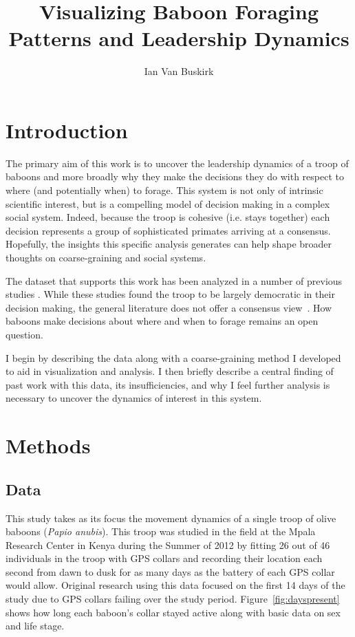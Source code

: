 \documentclass[11pt]{article}
\begin{document}
\title{Visualizing Baboon Foraging Patterns and Leadership Dynamics}
\author{Ian Van Buskirk}
\date{}
\maketitle

\section{Introduction}

The primary aim of this work is to uncover the leadership dynamics of a troop of baboons and more broadly why they make the decisions they do with respect to where (and potentially when) to forage. This system is not only of intrinsic scientific interest, but is a compelling model of decision making in a complex social system. Indeed, because the troop is cohesive (i.e. stays together) each decision represents a group of sophisticated primates arriving at a consensus. Hopefully, the insights this specific analysis generates can help shape broader thoughts on coarse-graining and social systems.

The dataset that supports this work has been analyzed in a number of previous studies \cite{strandburg2015shared,strandburg2017habitat,farine2017individual}. While these studies found the troop to be largely democratic in their decision making, the general literature does not offer a consensus view~\cite{tokuyama2017leadership,lee2016partially,king2011rule,stueckle2008follow,sapolsky2007primate}. How baboons make decisions about where and when to forage remains an open question.

I begin by describing the data along with a coarse-graining method I developed to aid in visualization and analysis. I then briefly describe a central finding of past work with this data, its insufficiencies, and why I feel further analysis is necessary to uncover the dynamics of interest in this system.

\section{Methods}

\subsection{Data}

This study takes as its focus the movement dynamics of a single troop of olive baboons (\textit{Papio anubis}). This troop was studied in the field at the Mpala Research Center in Kenya during the Summer of 2012 by fitting 26 out of 46 individuals in the troop with GPS collars and recording their location each second from dawn to dusk for as many days as the battery of each GPS collar would allow. Original research using this data focused on the first 14 days of the study due to GPS collars failing over the study period. Figure~\ref{fig:dayspresent} shows how long each baboon's collar stayed active along with basic data on sex and life stage.
\end{document}
